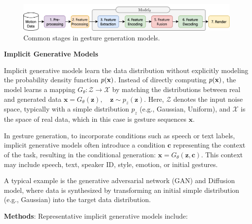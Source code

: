 \begin{figure}[htbp]
	\centering
	\includegraphics[width=0.9\linewidth]{figures/CommonStage.png}
	\caption{Common stages in gesture generation models.}
	\label{fig:CommonStage}
\end{figure}

\textbf{Implicit Generative Models}
\label{sec:ImplicitGenerativeModels}

Implicit generative models learn the data distribution without explicitly modeling the probability density function $p(\mathbf{x})$. Instead of directly computing $p(\mathbf{x})$, the model learns a mapping $G_{\theta}: \mathcal{Z} \to \mathcal{X}$ by matching the distributions between real and generated data $\mathbf{x} = G_\theta(\mathbf{z}), \quad \mathbf{z} \sim p_z(\mathbf{z})$. Here, $\mathcal{Z}$ denotes the input noise space, typically with a simple distribution \(p_{z}\) (e.g., Gaussian, Uniform), and \(\mathcal{X}\) is the space of real data, which in this case is gesture sequences \(\mathbf{x}\).

In gesture generation, to incorporate conditions such as speech or text labels, implicit generative models often introduce a condition $\mathbf{c}$ representing the context of the task, resulting in the conditional generation: $\mathbf{x} = G_\theta(\mathbf{z}, \mathbf{c})$. This context may include speech, text, speaker ID, style, emotion, or initial gestures.

A typical example is the generative adversarial network (GAN) and Diffusion model, where data is synthesized by transforming an initial simple distribution (e.g., Gaussian) into the target data distribution.


\textbf{Methods}: Representative implicit generative models include:

